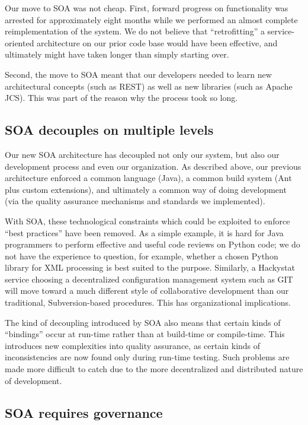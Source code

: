 \documentclass[conference,compsoc]{IEEEtran}
\begin{document}
Our move to SOA was not cheap.  First, forward progress on functionality was
arrested for approximately eight months while we performed an almost
complete reimplementation of the system.  We do not believe that
``retrofitting'' a service-oriented architecture on our prior code base
would have been effective, and ultimately might have taken longer than
simply starting over.  

Second, the move to SOA meant that our developers needed to learn new
architectural concepts (such as REST) as well as new libraries (such as
Apache JCS).  This was part of the reason why the process took so long.

\subsection{SOA decouples on multiple levels}

Our new SOA architecture has decoupled not only our system, but also our
development process and even our organization.  As described above, our
previous architecture enforced a common language (Java), a common build system (Ant
plus custom extensions), and ultimately a common way of doing development (via the
quality assurance mechanisms and standards we implemented).

With SOA, these technological constraints which could be exploited to
enforce ``best practices'' have been removed.  As a simple example, it is
hard for Java programmers to perform effective and useful code reviews on
Python code; we do not have the experience to question, for example,
whether a chosen Python library for XML processing is best suited to the
purpose. Similarly, a Hackystat service choosing a decentralized
configuration management system such as GIT will move toward a much
different style of collaborative development than our traditional,
Subversion-based procedures.  This has organizational implications.

The kind of decoupling introduced by SOA also means that certain kinds of
``bindings'' occur at run-time rather than at build-time or compile-time.
This introduces new complexities into quality assurance, as certain kinds
of inconsistencies are now found only during run-time testing.  Such
problems are made more difficult to catch due to the more decentralized and
distributed nature of development.

\subsection{SOA requires governance}
\end{document}
